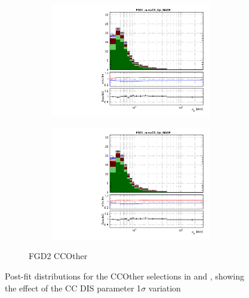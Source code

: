 \begin{figure}[h]
\begin{subfigure}[t]{\textwidth}
	\begin{subfigure}[t]{0.49\textwidth}
		\includegraphics[width=\textwidth, trim={0mm 0mm 0mm 6mm}, clip,page=223]{figures/mach3/data/postfit/2017b_NewDet_3Xsec_4Det_5Flux_NewXSecTune_Data_merge_PostFit_0_1_rootstack}
	\end{subfigure}
	\begin{subfigure}[t]{0.49\textwidth}
		\includegraphics[width=\textwidth, trim={0mm 0mm 0mm 6mm}, clip,page=224]{figures/mach3/data/postfit/2017b_NewDet_3Xsec_4Det_5Flux_NewXSecTune_Data_merge_PostFit_0_1_rootstack}
	\end{subfigure}
\caption{FGD2 CCOther}
\end{subfigure}
	\caption{Post-fit distributions for the CCOther selections in \pmu and \cosmu, showing the effect of the CC DIS parameter 1$\sigma$ variation}
	\label{fig:postfit_pmucosmu_data_ccother}
\end{figure}

